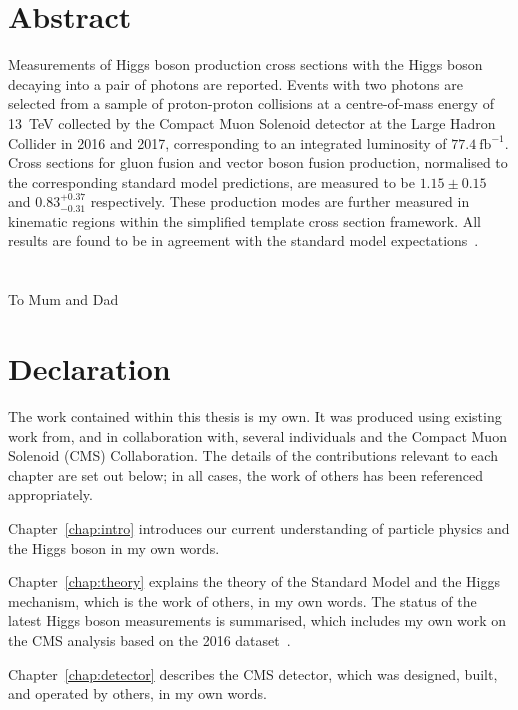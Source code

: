 \chapter*{\centering Abstract}
Measurements of Higgs boson production cross sections 
with the Higgs boson decaying into a pair of photons are reported.
Events with two photons are selected from a sample of proton-proton collisions 
at a centre-of-mass energy of \SI{13}{TeV} 
collected by the Compact Muon Solenoid detector at the Large Hadron Collider in 2016 and 2017,
corresponding to an integrated luminosity of $77.4~\mathrm{fb}^{-1}$.
Cross sections for gluon fusion and vector boson fusion production, 
normalised to the corresponding standard model predictions,
are measured to be $1.15 \pm 0.15$ and $0.83_{-0.31}^{+0.37}$ respectively.
These production modes are further measured in kinematic regions 
within the simplified template cross section framework.
All results are found to be in agreement with the standard model expectations~\cite{HIG-18-029}.


\chapter*{\centering }%
\begin{center}
    \thispagestyle{empty}
    To Mum and Dad
\end{center}


\chapter*{\centering Declaration}
The work contained within this thesis is my own. 
It was produced using existing work from, and in collaboration with, 
several individuals and the Compact Muon Solenoid (CMS) Collaboration. 
The details of the contributions relevant to each chapter are set out below;
in all cases, the work of others has been referenced appropriately.

Chapter~\ref{chap:intro} introduces our current understanding of particle physics 
and the Higgs boson in my own words.

Chapter~\ref{chap:theory} explains the theory of the Standard Model and the Higgs mechanism, 
which is the work of others, in my own words. 
The status of the latest Higgs boson measurements is summarised, 
which includes my own work on the CMS \Hgg analysis based on the 2016 dataset~\cite{HIG-16-040}.

Chapter~\ref{chap:detector} describes the CMS detector, 
which was designed, built, and operated by others, in my own words.


